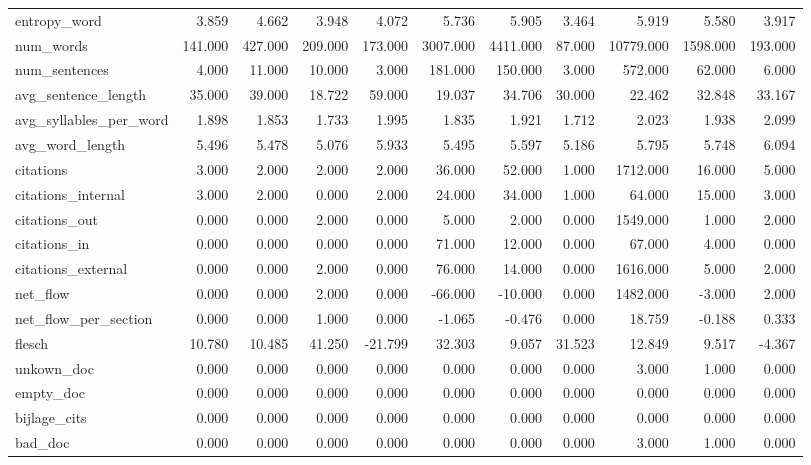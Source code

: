 \begin{tabular}{lrrrrrrrrrr}
\cline{1-11}
entropy\_word & 3.859 & 4.662 & 3.948 & 4.072 & 5.736 & 5.905 & 3.464 & 5.919 & 5.580 & 3.917 \\
\cline{1-11}
num\_words & 141.000 & 427.000 & 209.000 & 173.000 & 3007.000 & 4411.000 & 87.000 & 10779.000 & 1598.000 & 193.000 \\
\cline{1-11}
num\_sentences & 4.000 & 11.000 & 10.000 & 3.000 & 181.000 & 150.000 & 3.000 & 572.000 & 62.000 & 6.000 \\
\cline{1-11}
avg\_sentence\_length & 35.000 & 39.000 & 18.722 & 59.000 & 19.037 & 34.706 & 30.000 & 22.462 & 32.848 & 33.167 \\
\cline{1-11}
avg\_syllables\_per\_word & 1.898 & 1.853 & 1.733 & 1.995 & 1.835 & 1.921 & 1.712 & 2.023 & 1.938 & 2.099 \\
\cline{1-11}
avg\_word\_length & 5.496 & 5.478 & 5.076 & 5.933 & 5.495 & 5.597 & 5.186 & 5.795 & 5.748 & 6.094 \\
\cline{1-11}
citations & 3.000 & 2.000 & 2.000 & 2.000 & 36.000 & 52.000 & 1.000 & 1712.000 & 16.000 & 5.000 \\
\cline{1-11}
citations\_internal & 3.000 & 2.000 & 0.000 & 2.000 & 24.000 & 34.000 & 1.000 & 64.000 & 15.000 & 3.000 \\
\cline{1-11}
citations\_out & 0.000 & 0.000 & 2.000 & 0.000 & 5.000 & 2.000 & 0.000 & 1549.000 & 1.000 & 2.000 \\
\cline{1-11}
citations\_in & 0.000 & 0.000 & 0.000 & 0.000 & 71.000 & 12.000 & 0.000 & 67.000 & 4.000 & 0.000 \\
\cline{1-11}
citations\_external & 0.000 & 0.000 & 2.000 & 0.000 & 76.000 & 14.000 & 0.000 & 1616.000 & 5.000 & 2.000 \\
\cline{1-11}
net\_flow & 0.000 & 0.000 & 2.000 & 0.000 & -66.000 & -10.000 & 0.000 & 1482.000 & -3.000 & 2.000 \\
\cline{1-11}
net\_flow\_per\_section & 0.000 & 0.000 & 1.000 & 0.000 & -1.065 & -0.476 & 0.000 & 18.759 & -0.188 & 0.333 \\
\cline{1-11}
flesch & 10.780 & 10.485 & 41.250 & -21.799 & 32.303 & 9.057 & 31.523 & 12.849 & 9.517 & -4.367 \\
\cline{1-11}
unkown\_doc & 0.000 & 0.000 & 0.000 & 0.000 & 0.000 & 0.000 & 0.000 & 3.000 & 1.000 & 0.000 \\
\cline{1-11}
empty\_doc & 0.000 & 0.000 & 0.000 & 0.000 & 0.000 & 0.000 & 0.000 & 0.000 & 0.000 & 0.000 \\
\cline{1-11}
bijlage\_cits & 0.000 & 0.000 & 0.000 & 0.000 & 0.000 & 0.000 & 0.000 & 0.000 & 0.000 & 0.000 \\
\cline{1-11}
bad\_doc & 0.000 & 0.000 & 0.000 & 0.000 & 0.000 & 0.000 & 0.000 & 3.000 & 1.000 & 0.000 \\
\cline{1-11}
\bottomrule
\end{tabular}
